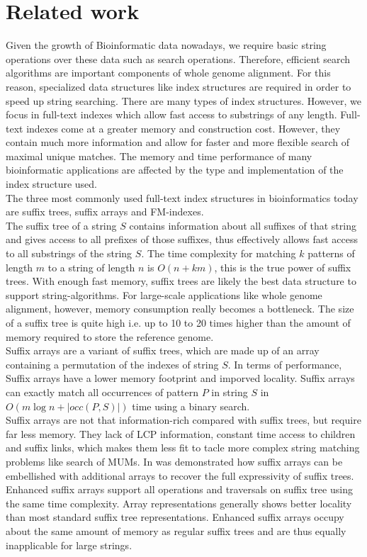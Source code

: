 \documentclass[runningheads,a4paper]{llncs}
\begin{document}
{\section{Related work}
Given the growth of Bioinformatic data nowadays, we require basic string operations over these data such as search operations. Therefore, efficient search algorithms are important components of whole genome alignment. For this reason, specialized data structures like index structures are required in order to speed up string searching. There are many types of index structures. However, we focus in full-text indexes which allow fast access to substrings of any length. Full-text indexes come at a greater memory and construction cost. However, they contain much more information and allow for faster and more flexible search of maximal unique matches. The memory and time performance of many bioinformatic applications are affected by the type and implementation of the index structure used.\\
The three most commonly used full-text index structures in bioinformatics today are suffix trees, suffix arrays and FM-indexes.\\
The suffix tree of a string $S$ contains information about all suffixes of that string and gives access to all prefixes of those suffixes, thus effectively allows fast access to all substrings of the string $S$. The time complexity for matching $k$ patterns of length $m$ to a string of length $n$ is $O(n+km)$, this is the true power of suffix trees. With enough fast memory, suffix trees are likely the best data structure to support string-algorithms. For large-scale applications like whole genome alignment, however, memory consumption really becomes a bottleneck. The size of a suffix tree is quite high i.e. up to 10 \cite{lazy} to 20 times \cite{kurtz} higher than the amount of memory required to store the reference genome.\\
Suffix arrays \cite{sa} are a variant of suffix trees, which are made up of an array containing a permutation of the indexes of string $S$. In terms of performance, Suffix arrays have a lower memory footprint and imporved locality. Suffix arrays can exactly match all occurrences of pattern $P$ in string $S$ in $O(m\log n+|occ(P,S)|)$ time using a binary search.\\
Suffix arrays are not that information-rich compared with suffix trees, but require far less memory. They lack of LCP information, constant time access to children and suffix links, which makes them less fit to tacle more complex string matching problems like search of MUMs. In \cite{abouelhoda} was demonstrated how suffix arrays can be embellished with additional arrays to recover the full expressivity of suffix trees. Enhanced suffix arrays support all operations and traversals on suffix tree using the same time complexity. Array representations generally shows better locality than most standard suffix tree representations. Enhanced suffix arrays occupy about the same amount of memory as regular suffix trees  and are thus equally inapplicable for large strings.\\
}
\end{document}
